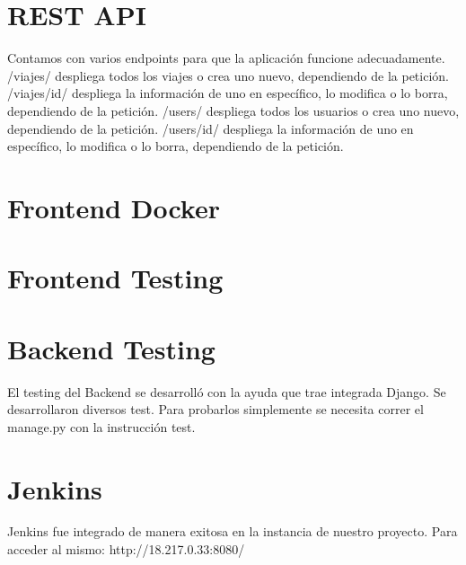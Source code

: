 \documentclass{article}
\begin{document}
	
	\section{REST API}
	Contamos con varios endpoints para que la aplicación funcione adecuadamente.
	\linebreak
	/viajes/ despliega todos los viajes o crea uno nuevo, dependiendo de la petición.
	\linebreak
	/viajes/id/ despliega la información de uno en específico, lo modifica o lo borra, dependiendo de la petición.
	\linebreak
	/users/ despliega todos los usuarios o crea uno nuevo, dependiendo de la petición.
	\linebreak
	/users/id/ despliega la información de uno en específico, lo modifica o lo borra, dependiendo de la petición.
	
	
	\section{Frontend Docker}
	
	
	\section{Frontend Testing}
	

	\section{Backend Testing}
	El testing del Backend se desarrolló con la ayuda que trae integrada Django. Se desarrollaron diversos test. Para probarlos simplemente se necesita correr el manage.py con la instrucción test.
	
	\section{Jenkins}
	Jenkins fue integrado de manera exitosa en la instancia de nuestro proyecto. Para acceder al mismo: http://18.217.0.33:8080/
	
	
\end{document}

